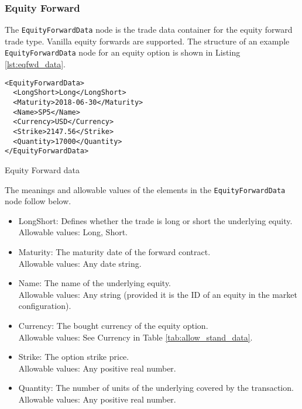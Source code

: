 \subsubsection{Equity Forward}

The \lstinline!EquityForwardData!  node is the trade data container for the equity forward trade type.  Vanilla equity 
forwards are supported. The structure of an example \lstinline!EquityForwardData! node for an equity option is shown in 
Listing \ref{lst:eqfwd_data}.

\begin{listing}[H]
\begin{verbatim}
<EquityForwardData>
  <LongShort>Long</LongShort>
  <Maturity>2018-06-30</Maturity>
  <Name>SP5</Name>
  <Currency>USD</Currency>
  <Strike>2147.56</Strike>
  <Quantity>17000</Quantity>
</EquityForwardData>
\end{verbatim}
\caption{Equity Forward data}
\label{lst:eqfwd_data}
\end{listing}

The meanings and allowable values of the elements in the \lstinline!EquityForwardData!  node follow below.

\begin{itemize}
	\item LongShort: Defines whether the trade is long or short the underlying equity. \\
	Allowable values: Long, Short.
	\item Maturity: The maturity date of the forward contract. \\
	Allowable values: Any date string.
	\item Name: The name of the underlying equity. \\
	Allowable values:  Any string (provided it is the ID of an equity in the market configuration).
	\item Currency: The bought currency of the equity option. \\
	Allowable values:  See Currency in Table \ref{tab:allow_stand_data}.	
	\item Strike: The option strike price. \\
	Allowable values:  Any positive real number.	
	\item Quantity: The number of units of the underlying covered by the transaction. \\
	Allowable values:  Any positive real number.
\end{itemize}

